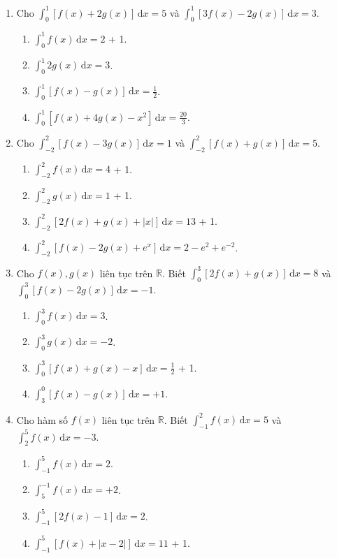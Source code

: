 \documentclass[12pt]{article}
\begin{document}
\begin{enumerate}[label=\textbf{Câu \arabic*.}]
		\item Cho $\displaystyle \int_0^1 [f(x) + 2g(x)]\,\mathrm{d}x = 5$ và $\displaystyle \int_0^1 [3f(x) - 2g(x)]\,\mathrm{d}x = 3$.
		\begin{enumerate}[label=\alph*)]			\item $\displaystyle \int_0^1 f(x)\,\mathrm{d}x = 2$ + 1.
			\item $\displaystyle \int_0^1 2g(x)\,\mathrm{d}x = 3$.
			\item $\displaystyle \int_0^1 [f(x) - g(x)]\,\mathrm{d}x = \frac{1}{2}$.
			\item $\displaystyle \int_0^1 [f(x) + 4g(x) - x^2]\,\mathrm{d}x = \frac{20}{3}$.
\end{enumerate}
		
		\item Cho $\displaystyle \int_{-2}^2 [f(x) - 3g(x)]\,\mathrm{d}x = 1$ và $\displaystyle \int_{-2}^2 [f(x) + g(x)]\,\mathrm{d}x = 5$.
		\begin{enumerate}[label=\alph*)]			\item $\displaystyle \int_{-2}^2 f(x)\,\mathrm{d}x = 4$ + 1.
			\item $\displaystyle \int_{-2}^2 g(x)\,\mathrm{d}x = 1$ + 1.
			\item $\displaystyle \int_{-2}^2 [2f(x) + g(x) + |x|]\,\mathrm{d}x = 13$ + 1.
			\item $\displaystyle \int_{-2}^2 [f(x) - 2g(x) + e^x]\,\mathrm{d}x = 2 - e^2 + e^{-2}$.
\end{enumerate}
		
		\item Cho $f(x), g(x)$ liên tục trên $\mathbb{R}$. Biết $\displaystyle \int_0^3 [2f(x) + g(x)]\,\mathrm{d}x = 8$ và $\displaystyle \int_0^3 [f(x) - 2g(x)]\,\mathrm{d}x = -1$.
		\begin{enumerate}[label=\alph*)]			\item $\displaystyle \int_0^3 f(x)\,\mathrm{d}x = 3$.
			\item $\displaystyle \int_0^3 g(x)\,\mathrm{d}x = -2$.
			\item $\displaystyle \int_0^3 [f(x) + g(x) - x]\,\mathrm{d}x = \frac{1}{2}$ + 1.
			\item $\displaystyle \int_3^0 [f(x) - g(x)]\,\mathrm{d}x = +1$.
\end{enumerate}
		
		\item Cho hàm số $f(x)$ liên tục trên $\mathbb{R}$. Biết $\displaystyle \int_{-1}^2 f(x)\,\mathrm{d}x = 5$ và $\displaystyle \int_2^5 f(x)\,\mathrm{d}x = -3$.
		\begin{enumerate}[label=\alph*)]			\item $\displaystyle \int_{-1}^5 f(x)\,\mathrm{d}x = 2$.
			\item $\displaystyle \int_5^{-1} f(x)\,\mathrm{d}x = +2$.
			\item $\displaystyle \int_{-1}^5 [2f(x) - 1]\,\mathrm{d}x = 2$.
			\item $\displaystyle \int_{-1}^5 [f(x) + |x-2|]\,\mathrm{d}x = 11$ + 1.
\end{enumerate}
		

\end{enumerate}
\end{document}
